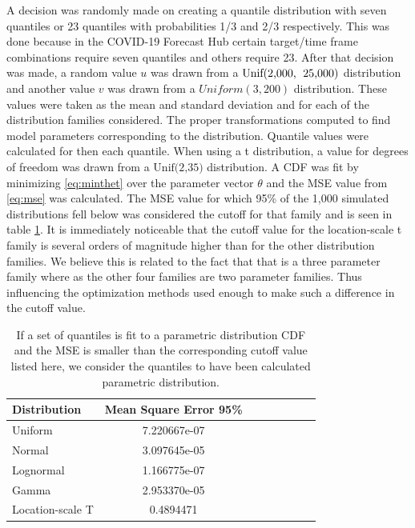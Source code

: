 \documentclass[11pt,notitlepage]{isuthesis}
\begin{document}
A decision was randomly made on creating a quantile distribution with seven 
quantiles or 23
quantiles with probabilities 1/3 and 2/3 respectively. This was done because 
in the COVID-19 Forecast Hub certain target/time frame combinations require 
seven quantiles and others 
require 23. After that decision was made, a random value $u$ was drawn from
a $\mbox{Unif(2,000,\; 25,000)}$ distribution and another value $v$ was drawn
from a $Uniform(3, 200)$ distribution. These values were taken as the mean and
standard deviation and for each of the distribution families considered. The
proper transformations computed to find model parameters corresponding to the 
distribution. Quantile values were calculated for then each quantile. When using 
a t distribution, a value for degrees of freedom was drawn from a 
$\mbox{Unif(2,35)}$ distribution. A CDF
was fit by minimizing \eqref{eq:minthet} over the parameter
vector $\theta$ and the MSE value from \eqref{eq:mse} was 
calculated. The MSE value for which 95\% of the 1,000 simulated distributions
fell below was considered the cutoff for that family and is seen in table 
\ref{table:quantcutoffs}. It is immediately noticeable that the cutoff value 
for the location-scale t family is several orders of magnitude higher than for 
the other distribution families. We believe this is related to the fact that 
that is a three parameter family where as the other four families are two 
parameter families. Thus influencing the optimization methods used enough to 
make such a difference in the cutoff value. 

\begin{table}[h!]
  \centering
  \begin{tabular}{l*{6}{c}r}
  Distribution          & Mean Square Error 95\%  \\
  \hline
  Uniform               & 7.220667e-07   \\
  Normal                & 3.097645e-05  \\
  Lognormal             & 1.166775e-07  \\
  Gamma                 & 2.953370e-05  \\
  Location-scale T      & 0.4894471 \\
  \end{tabular}
  \begin{center}
\begin{minipage}{10cm}
\captionsetup{font=scriptsize}
  \caption[Quantile cutoff values]{If a set of quantiles
  is fit to a parametric distribution CDF and the MSE is smaller than
  the corresponding cutoff value listed here, we consider the quantiles to 
  have been calculated parametric distribution.}
  \label{table:quantcutoffs}
  \end{minipage}
  \end{center}
\end{table}
\end{document}
